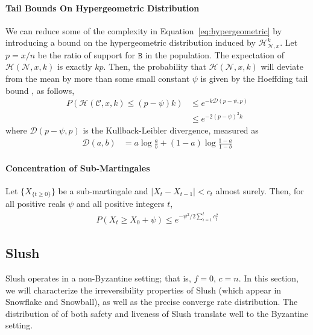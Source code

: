 \documentclass[letterpaper,twocolumn,10pt]{article}
\theoremstyle{definition}
\begin{document}
\begin{appendices}
\paragraph{Tail Bounds On Hypergeometric Distribution} We can reduce some of the complexity in Equation~\ref{eq:hypergeometric} by introducing a bound on the hypergeometric distribution induced by $\mathcal{H}^k_{\mathcal{N},x}$.
Let $p=x/n$ be the ratio of support for $\mathtt{B}$ in the population.
The expectation of $\mathcal{H}(\mathcal{N}, x, k)$ is exactly $kp$.
Then, the probability that $\mathcal{H}(\mathcal{N}, x, k)$ will deviate from the mean by more than some small constant $\psi$ is given by the Hoeffding tail bound \cite{hoeffding1963probability}, as follows,
\begin{equation}
\begin{split}
    P(\mathcal{H}(\mathcal{C}, x, k) \leq (p-\psi)k) &\leq e^{-k\mathcal{D}(p-\psi, p)}\\
    &\leq e^{-2(p-\psi)^2k}
\end{split}
\end{equation}
where $\mathcal{D}(p-\psi, p)$ is the Kullback-Leibler divergence, measured as
\begin{equation}
\begin{split}
    \mathcal{D}(a, b) &= a \log \frac{a}{b} + (1 - a) \log \frac{1 - a}{1 - b}
\end{split}
\end{equation}

\paragraph{Concentration of Sub-Martingales}
Let $\{X_{\{t \geq 0\}}\}$ be a sub-martingale and $|X_t - X_{t-1}| < c_t$ almost surely. Then, for all positive reals $\psi$ and all positive integers $t$, 
\begin{equation}
\begin{split}
P(X_t \geq X_0 + \psi) \leq e^{-\psi^2 / 2\sum_{i = 1}^{t} c_t^2}
\end{split}
\label{eq:submartingale}
\end{equation}

\subsection{Slush}
Slush operates in a non-Byzantine setting; that is, $f = 0$, $c = n$.
In this section, we will characterize the irreversibility properties of Slush (which appear in Snowflake and Snowball), as well as the precise converge rate distribution. The distribution of of both safety and liveness of Slush translate well to the Byzantine setting.


\end{appendices}
\end{document}
